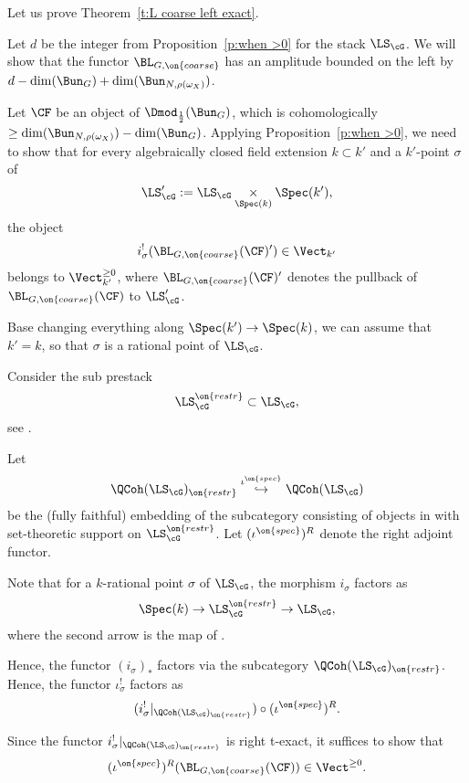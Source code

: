 \documentclass[9pt]{amsart}
\theoremstyle{remark}
\theoremstyle{definition}
\theoremstyle{remark}
\newcommand{\thmref}[1]{Theorem~\ref{#1}}
\newcommand{\propref}[1]{Proposition~\ref{#1}}
\numberwithin{equation}{section}
\begin{document}
Let us prove \thmref{t:L coarse left exact}.

\medskip

Let $d$ be the integer from \propref{p:when >0} for the stack $\LS_\cG$.  We will show that the functor
$\BL_{G,\on{coarse}}$ has an amplitude bounded on the left by $d-\dim(\Bun_G)+\dim(\Bun_{N,\rho(\omega_X)})$.

\medskip

Let $\CF$ be an object of $\Dmod_{\frac{1}{2}}(\Bun_G)$, which is cohomologically 
$\geq \dim(\Bun_{N,\rho(\omega_X)})-\dim(\Bun_G)$.
Applying \propref{p:when >0}, we need to show that for every algebraically
closed field extension $k\subset k'$ and a $k'$-point $\sigma$ of 
$$\LS'_\cG:=\LS_\cG\underset{\Spec(k)}\times \Spec(k'),$$
the object
$$i_\sigma^!(\BL_{G,\on{coarse}}(\CF)')\in \Vect_{k'}$$
belongs to $\Vect_{k'}^{\geq 0}$, where $\BL_{G,\on{coarse}}(\CF)'$ denotes the pullback of 
$\BL_{G,\on{coarse}}(\CF)$ to $\LS'_\cG$. 

\medskip

Base changing everything along $\Spec(k')\to \Spec(k)$, we can assume that $k'=k$,
so that $\sigma$ is a rational point of $\LS_\cG$. 

\sssec{}  \label{sss:restr}

Consider the sub prestack
$$\LS^{\on{restr}}_\cG \subset \LS_\cG,$$
see \cite[Sect. 4.1]{AGKRRV}.

\medskip

Let $$\QCoh(\LS_\cG)_{\on{restr}}\overset{\iota^{\on{spec}}} \hookrightarrow \QCoh(\LS_\cG)$$
be the (fully faithful) embedding of the subcategory consisting of objects in with set-theoretic support on $\LS^{\on{restr}}_\cG$. 
Let $(\iota^{\on{spec}})^R$ denote the right adjoint functor. 

\sssec{} \label{sss:red to restr}

Note that for a $k$-rational point $\sigma$ of $\LS_\cG$, the morphism $i_\sigma$ factors as 
$$\Spec(k) \to \LS^{\on{restr}}_\cG \to \LS_\cG,$$
where the second arrow is the map of \cite[Equation (4.2)]{AGKRRV}.

\medskip

Hence, the functor $(i_\sigma)_*$ factors via the subcategory $\QCoh(\LS_\cG)_{\on{restr}}$. Hence, the functor $\iota_\sigma^!$
factors as
$$(i_\sigma^!|_{\QCoh(\LS_\cG)_{\on{restr}}}) \circ (\iota^{\on{spec}})^R.$$

Since the functor $i_\sigma^!|_{\QCoh(\LS_\cG)_{\on{restr}}}$ is right t-exact, it suffices to show that
$$(\iota^{\on{spec}})^R(\BL_{G,\on{coarse}}(\CF))\in \Vect^{\geq 0}.$$
\end{document}
